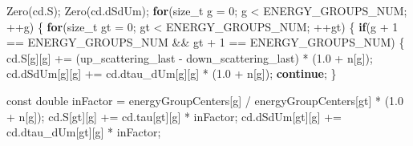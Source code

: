 \documentclass[
]{article}
\newenvironment{Shaded}{}{}
\newcommand{\AttributeTok}[1]{\textcolor[rgb]{0.49,0.56,0.16}{#1}}
\newcommand{\ControlFlowTok}[1]{\textcolor[rgb]{0.00,0.44,0.13}{\textbf{#1}}}
\newcommand{\DataTypeTok}[1]{\textcolor[rgb]{0.56,0.13,0.00}{#1}}
\newcommand{\DecValTok}[1]{\textcolor[rgb]{0.25,0.63,0.44}{#1}}
\newcommand{\FloatTok}[1]{\textcolor[rgb]{0.25,0.63,0.44}{#1}}
\newcommand{\NormalTok}[1]{#1}
\newcommand{\OperatorTok}[1]{\textcolor[rgb]{0.40,0.40,0.40}{#1}}
\begin{document}
\begin{Shaded}
\begin{Highlighting}[]
\NormalTok{Zero}\OperatorTok{(}\NormalTok{cd}\OperatorTok{.}\NormalTok{S}\OperatorTok{);}
\NormalTok{Zero}\OperatorTok{(}\NormalTok{cd}\OperatorTok{.}\NormalTok{dSdUm}\OperatorTok{);}
\ControlFlowTok{for}\OperatorTok{(}\DataTypeTok{size\_t}\NormalTok{ g }\OperatorTok{=} \DecValTok{0}\OperatorTok{;}\NormalTok{ g }\OperatorTok{\textless{}}\NormalTok{ ENERGY\_GROUPS\_NUM}\OperatorTok{;} \OperatorTok{++}\NormalTok{g}\OperatorTok{)}
\OperatorTok{\{}
    \ControlFlowTok{for}\OperatorTok{(}\DataTypeTok{size\_t}\NormalTok{ gt }\OperatorTok{=} \DecValTok{0}\OperatorTok{;}\NormalTok{ gt }\OperatorTok{\textless{}}\NormalTok{ ENERGY\_GROUPS\_NUM}\OperatorTok{;} \OperatorTok{++}\NormalTok{gt}\OperatorTok{)}
    \OperatorTok{\{}
        \ControlFlowTok{if}\OperatorTok{(}\NormalTok{g }\OperatorTok{+} \DecValTok{1} \OperatorTok{==}\NormalTok{ ENERGY\_GROUPS\_NUM }\OperatorTok{\&\&}\NormalTok{ gt }\OperatorTok{+} \DecValTok{1} \OperatorTok{==}\NormalTok{ ENERGY\_GROUPS\_NUM}\OperatorTok{)}
        \OperatorTok{\{}
\NormalTok{            cd}\OperatorTok{.}\NormalTok{S}\OperatorTok{[}\NormalTok{g}\OperatorTok{][}\NormalTok{g}\OperatorTok{]} \OperatorTok{+=} \OperatorTok{(}\NormalTok{up\_scattering\_last }\OperatorTok{{-}}\NormalTok{ down\_scattering\_last}\OperatorTok{)} \OperatorTok{*} \OperatorTok{(}\FloatTok{1.0} \OperatorTok{+}\NormalTok{ n}\OperatorTok{[}\NormalTok{g}\OperatorTok{]);}
\NormalTok{            cd}\OperatorTok{.}\NormalTok{dSdUm}\OperatorTok{[}\NormalTok{g}\OperatorTok{][}\NormalTok{g}\OperatorTok{]} \OperatorTok{+=}\NormalTok{ cd}\OperatorTok{.}\NormalTok{dtau\_dUm}\OperatorTok{[}\NormalTok{g}\OperatorTok{][}\NormalTok{g}\OperatorTok{]} \OperatorTok{*} \OperatorTok{(}\FloatTok{1.0} \OperatorTok{+}\NormalTok{ n}\OperatorTok{[}\NormalTok{g}\OperatorTok{]);}
            \ControlFlowTok{continue}\OperatorTok{;}
        \OperatorTok{\}}

        \AttributeTok{const} \DataTypeTok{double}\NormalTok{ inFactor }\OperatorTok{=}\NormalTok{ energyGroupCenters}\OperatorTok{[}\NormalTok{g}\OperatorTok{]} \OperatorTok{/}\NormalTok{ energyGroupCenters}\OperatorTok{[}\NormalTok{gt}\OperatorTok{]} \OperatorTok{*} \OperatorTok{(}\FloatTok{1.0} \OperatorTok{+}\NormalTok{ n}\OperatorTok{[}\NormalTok{g}\OperatorTok{]);}
\NormalTok{        cd}\OperatorTok{.}\NormalTok{S}\OperatorTok{[}\NormalTok{gt}\OperatorTok{][}\NormalTok{g}\OperatorTok{]} \OperatorTok{+=}\NormalTok{ cd}\OperatorTok{.}\NormalTok{tau}\OperatorTok{[}\NormalTok{gt}\OperatorTok{][}\NormalTok{g}\OperatorTok{]} \OperatorTok{*}\NormalTok{ inFactor}\OperatorTok{;}
\NormalTok{        cd}\OperatorTok{.}\NormalTok{dSdUm}\OperatorTok{[}\NormalTok{gt}\OperatorTok{][}\NormalTok{g}\OperatorTok{]} \OperatorTok{+=}\NormalTok{ cd}\OperatorTok{.}\NormalTok{dtau\_dUm}\OperatorTok{[}\NormalTok{gt}\OperatorTok{][}\NormalTok{g}\OperatorTok{]} \OperatorTok{*}\NormalTok{ inFactor}\OperatorTok{;}


\end{Highlighting}
\end{Shaded}
\end{document}
